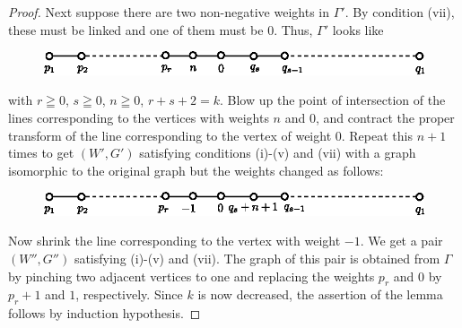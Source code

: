 \begin{proof}
Next suppose there are two non-negative weights in $\Gamma'$. By condition (vii), these must be linked and one of them must be $0$. Thus, $\Gamma'$ looks like
\begin{figure}[H]
\centering
\includegraphics{fig6.eps}
\end{figure}
\noindent
with $r \geqq 0$, $s \geqq 0$, $n \geqq 0$, $r + s + 2 = k$. Blow up the point of intersection of the lines corresponding to the vertices with weights $n$ and $0$, and contract the proper transform of the line corresponding to the vertex of weight 0. Repeat this $n+1$ times to get $(W',G')$ satisfying conditions (i)-(v) and (vii) with a graph isomorphic to the original graph but the weights changed as follows:
\begin{figure}[H]
\centering
\includegraphics{fig7.eps}
\end{figure}\pageoriginale
\noindent
Now shrink the line corresponding to the vertex with weight $-1$. We get a pair $(W'',G'')$ satisfying (i)-(v) and (vii). The graph of this pair is obtained  from $\Gamma$ by pinching two adjacent vertices to one and replacing the weights $p_r$ and $0$ by $p_r+1$ and $1$, respectively. Since $k$ is now decreased, the assertion of the lemma follows by induction hypothesis.
\end{proof}


